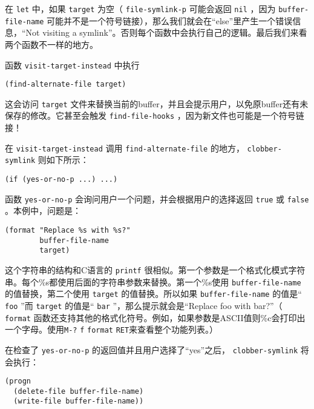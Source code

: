 在 \texttt{let} 中，如果 \texttt{target} 为空（ \texttt{file-symlink-p} 可能会返回 \texttt{nil} ，因为 \texttt{buffer-file-name} 可能并不是一个符号链接），那么我们就会在“else”里产生一个错误信息，“Not visiting a symlink”。否则每个函数中会执行自己的逻辑。最后我们来看两个函数不一样的地方。

函数 \texttt{visit-target-instead} 中执行

\begin{verbatim}
(find-alternate-file target)
\end{verbatim}

这会访问 \texttt{target} 文件来替换当前的buffer，并且会提示用户，以免原buffer还有未保存的修改。它甚至会触发 \texttt{find-file-hooks} ，因为新文件也可能是一个符号链接！

在 \texttt{visit-target-instead} 调用 \texttt{find-alternate-file} 的地方， \texttt{clobber-symlink} 则如下所示：

\begin{verbatim}
(if (yes-or-no-p ...) ...)
\end{verbatim}

函数 \texttt{yes-or-no-p} 会询问用户一个问题，并会根据用户的选择返回 \texttt{true} 或 \texttt{false} 。本例中，问题是：

\begin{verbatim}
(format "Replace %s with %s?"
        buffer-file-name
        target)
\end{verbatim}

这个字符串的结构和C语言的 \texttt{printf} 很相似。第一个参数是一个格式化模式字符串。每个\%s都使用后面的字符串参数来替换。第一个\%s使用 \texttt{buffer-file-name} 的值替换，第二个使用 \texttt{target} 的值替换。所以如果 \texttt{buffer-file-name} 的值是“ \texttt{foo} ”而 \texttt{target} 的值是“ \texttt{bar} ”，那么提示就会是“Replace foo with bar?”（ \texttt{format} 函数还支持其他的格式化符号。例如，如果参数是ASCII值则\%c会打印出一个字母。使用\verb|M-?| \verb|f| \texttt{format} \verb|RET|来查看整个功能列表。）

在检查了 \texttt{yes-or-no-p} 的返回值并且用户选择了“yes”之后， \texttt{clobber-symlink} 将会执行：

\begin{verbatim}
(progn
  (delete-file buffer-file-name)
  (write-file buffer-file-name))
\end{verbatim}

